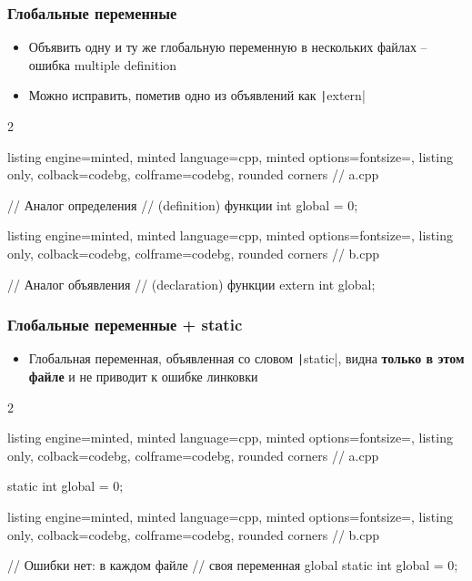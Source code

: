 \documentclass[10pt]{beamer}
\begin{document}
\begin{frame}[fragile]
\frametitle{Глобальные переменные}
\begin{itemize}
\item Объявить одну и ту же глобальную переменную в нескольких файлах -- ошибка multiple definition
\pause
\item Можно исправить, пометив одно из объявлений как \texttt|extern|
\end{itemize}
\begin{multicols}{2}
\begin{tcblisting}{listing engine=minted, minted language=cpp, minted options={fontsize=\scriptsize}, listing only, colback=codebg, colframe=codebg, rounded corners}
// a.cpp

// Аналог определения
// (definition) функции
int global = 0;
\end{tcblisting}
\columnbreak
\begin{tcblisting}{listing engine=minted, minted language=cpp, minted options={fontsize=\scriptsize}, listing only, colback=codebg, colframe=codebg, rounded corners}
// b.cpp

// Аналог объявления
// (declaration) функции
extern int global;
\end{tcblisting}
\end{multicols}
\end{frame}

\begin{frame}[fragile]
\frametitle{Глобальные переменные + static}
\begin{itemize}
\item Глобальная переменная, объявленная со словом \texttt|static|, видна \textbf{только в этом файле} и не приводит к ошибке линковки
\end{itemize}
\begin{multicols}{2}
\begin{tcblisting}{listing engine=minted, minted language=cpp, minted options={fontsize=\scriptsize}, listing only, colback=codebg, colframe=codebg, rounded corners}
// a.cpp



static int global = 0;
\end{tcblisting}
\columnbreak
\begin{tcblisting}{listing engine=minted, minted language=cpp, minted options={fontsize=\scriptsize}, listing only, colback=codebg, colframe=codebg, rounded corners}
// b.cpp

// Ошибки нет: в каждом файле
// своя переменная global
static int global = 0;
\end{tcblisting}
\end{multicols}
\end{frame}
\end{document}
